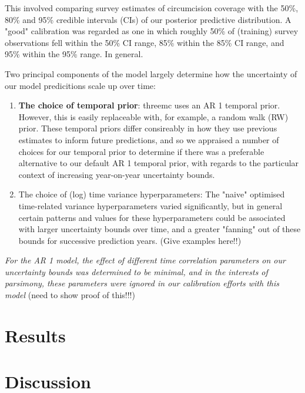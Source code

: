 \documentclass{article}
\begin{document}
This involved comparing survey estimates of circumcision coverage with the 50\%, 80\% and 95\% credible intervals (CIs) of our posterior predictive distribution. A "good" calibration
was regarded as one in which roughly 50\% of (training) survey observations fell within the 50\% CI range, 85\% within the 85\% CI range, and 95\% within the 95\% range. In general.

Two principal components of the model largely determine how the uncertainty of our model predicitions scale up over time: 
\begin{enumerate}
\item \textbf{The choice of temporal prior}: threemc uses an AR 1 temporal prior. However, this is easily replaceable with, for example, a random walk (RW) prior. These temporal priors
differ consireably in how they use previous estimates to inform future predictions, and so we appraised a number of choices for our temporal prior to determine if there
was a preferable alternative to our default AR 1 temporal prior, with regards to the particular context of increasing year-on-year uncertainty bounds.
\item The choice of (log) time variance hyperparameters: The "naive" optimised time-related variance hyperparameters varied significantly, but in general certain patterns and values
for these hyperparameters could be associated with larger uncertainty bounds over time, and a greater "fanning" out of these bounds for successive prediction years. (Give
examples here!!)
\end{enumerate}

\emph{For the AR 1 model, the effect of different time correlation parameters on our uncertainty bounds was determined to be minimal, and in the interests of parsimony, these parameters were}
\emph{ignored in our calibration efforts with this model} (need to show proof of this!!!)

\section*{Results}
\label{sec:org0ad58a5}

\section*{}
\label{sec:org4d19a77}

\section*{Discussion}
\label{sec:org69af492}
\end{document}
